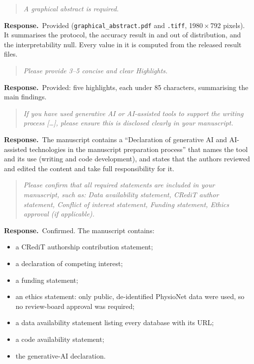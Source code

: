 \documentclass[11pt]{article}
\newenvironment{reviewer}{\begin{quote}\itshape\color{revcol}}{\end{quote}}
\newcommand{\resp}{\textbf{Response.}~}
\begin{document}
\begin{reviewer}
A graphical abstract is required.
\end{reviewer}
\resp Provided (\texttt{graphical\_abstract.pdf} and \texttt{.tiff}, 1980\,$\times$\,792 pixels). It summarises the protocol, the accuracy result in and out of distribution, and the interpretability null. Every value in it is computed from the released result files.

\begin{reviewer}
Please provide 3--5 concise and clear Highlights.
\end{reviewer}
\resp Provided: five highlights, each under 85 characters, summarising the main findings.

\begin{reviewer}
If you have used generative AI or AI-assisted tools to support the writing process [\ldots], please ensure this is disclosed clearly in your manuscript.
\end{reviewer}
\resp The manuscript contains a ``Declaration of generative AI and AI-assisted technologies in the manuscript preparation process'' that names the tool and its use (writing and code development), and states that the authors reviewed and edited the content and take full responsibility for it.

\begin{reviewer}
Please confirm that all required statements are included in your manuscript, such as: Data availability statement, CRediT author statement, Conflict of interest statement, Funding statement, Ethics approval (if applicable).
\end{reviewer}
\resp Confirmed. The manuscript contains:
\begin{itemize}[leftmargin=1.2em,itemsep=2pt]
\item a CRediT authorship contribution statement;
\item a declaration of competing interest;
\item a funding statement;
\item an ethics statement: only public, de-identified PhysioNet data were used, so no review-board approval was required;
\item a data availability statement listing every database with its URL;
\item a code availability statement;
\item the generative-AI declaration.
\end{itemize}

\end{document}
